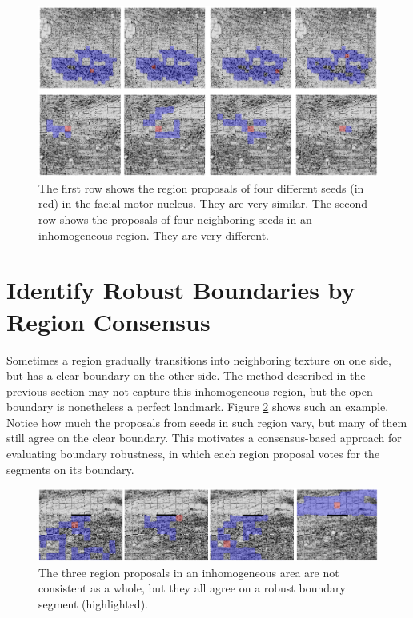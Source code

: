 \documentclass{llncs}
\begin{document}

\begin{figure}
	\includegraphics[width=\textwidth]{../figures/ProposalsGoodAndBad.png}
	\caption{The first row shows the region proposals of four different seeds (in red) in the facial motor nucleus. They are very similar. The second row shows the proposals of four neighboring seeds in an inhomogeneous region. They are very different.} %
	\label{fig:ConsistentProposals}
\end{figure}

 
\section{Identify Robust Boundaries by Region Consensus}

Sometimes a region gradually transitions into neighboring texture on one side, but has a clear boundary on the other side. The method described in the previous section may not capture this inhomogeneous region, but the open boundary is nonetheless a perfect landmark. Figure \ref{fig:RobustBoundaryExample} shows such an example. Notice how much the proposals from seeds in such region vary, but many of them still agree on the clear boundary. This motivates a consensus-based approach for evaluating boundary robustness, in which each region proposal votes for the segments on its boundary.

\begin{figure}
	\includegraphics[width=\textwidth]{../figures/RobustBoundaryExampleHighlightLine.png}
	\caption{The three region proposals in an inhomogeneous area are not consistent as a whole, but they all agree on a robust boundary segment (highlighted).}
	\label{fig:RobustBoundaryExample}
\end{figure}
\end{document}
